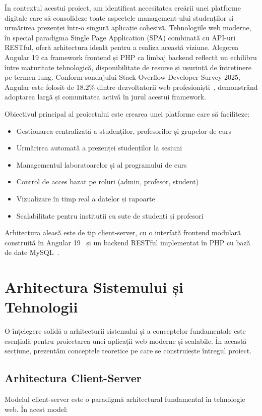 \documentclass[conference]{IEEEtran}
\begin{document}
În contextul acestui proiect, am identificat necesitatea creării unei platforme digitale care să consolideze toate aspectele management-ului studenților
și urmărirea prezenței într-o singură aplicație cohesivă. Tehnologiile web moderne, în special paradigma Single Page Application (SPA)
combinată cu API-uri RESTful, oferă arhitectura ideală pentru a realiza această viziune. Alegerea Angular 19 ca
framework frontend și PHP ca limbaj backend reflectă un echilibru între maturitate tehnologică, disponibilitate de resurse și
ușurință de întreținere pe termen lung. Conform sondajului Stack Overflow Developer Survey 2025, Angular este folosit de 18.2\%
dintre dezvoltatorii web profesioniști~\cite{StackOverflow2025}, demonstrând adoptarea largă și comunitatea activă în jurul acestui framework.

Obiectivul principal al proiectului este crearea unei platforme care să
faciliteze:

\begin{itemize}
    \item Gestionarea centralizată a studenților, profesorilor și grupelor de curs
    \item Urmărirea automată a prezenței studenților la sesiuni
    \item Managementul laboratoarelor și al programului de curs
    \item Control de acces bazat pe roluri (admin, profesor, student)
    \item Vizualizare în timp real a datelor și rapoarte
    \item Scalabilitate pentru instituții cu sute de studenți și profesori
\end{itemize}

Arhitectura aleasă este de tip client-server, cu o interfață frontend modulară
construită în Angular 19~\cite{Angular2024} și un backend RESTful implementat
în PHP cu bază de date MySQL~\cite{MySQL2024}.

\section{Arhitectura Sistemului și Tehnologii}
O înțelegere solidă a arhitecturii sistemului și a conceptelor fundamentale
este esențială pentru proiectarea unei aplicații web moderne și scalabile. În
această secțiune, prezentăm conceptele teoretice pe care se construiește
întregul proiect.

\subsection{Arhitectura Client-Server}
Modelul client-server este o paradigmă arhitectural fundamental în tehnologie
web. În acest model:
\end{document}
